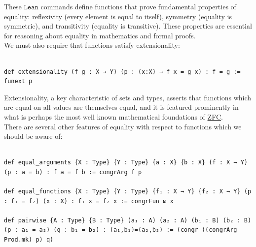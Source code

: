 \documentclass{book}
\theoremstyle{definition}
\newcounter{lcounter}
\begin{document}
These $\texttt{Lean}$ commands define functions that prove fundamental properties of equality: reflexivity (every element is equal to itself), symmetry (equality is symmetric), and transitivity (equality is transitive). These properties are essential for reasoning about equality in mathematics and formal proofs.\\

We must also require that functions satisfy extensionality:

\begin{center}
\begin{tcolorbox}[width=5in,colback={white},title={\begin{center}\texttt{Lean \thelcounter} \addtocounter{lcounter}{1}  \end{center}},colbacktitle=Blue,coltitle=black]
\begin{verbatim}

def extensionality (f g : X → Y) (p : (x:X) → f x = g x) : f = g := funext p

\end{verbatim}
\end{tcolorbox}
\end{center}

Extensionality, a key characteristic of sets and types, asserts that functions which are equal on all values are themselves equal, and it is featured prominently in what is perhaps the most well known mathematical foundations of \href{https://encyclopediaofmath.org/wiki/ZFC}{ZFC}.\\

There are several other features of equality with respect to functions which we should be aware of:

\begin{center}
\begin{tcolorbox}[width=5in,colback={white},title={\begin{center}\texttt{Lean \thelcounter} \addtocounter{lcounter}{1}  \end{center}},colbacktitle=Blue,coltitle=black]
\begin{verbatim}

def equal_arguments {X : Type} {Y : Type} {a : X} {b : X} (f : X → Y) (p : a = b) : f a = f b := congrArg f p

def equal_functions {X : Type} {Y : Type} {f₁ : X → Y} {f₂ : X → Y} (p : f₁ = f₂) (x : X) : f₁ x = f₂ x := congrFun ω x

def pairwise {A : Type} {B : Type} (a₁ : A) (a₂ : A) (b₁ : B) (b₂ : B) (p : a₁ = a₂) (q : b₁ = b₂) : (a₁,b₁)=(a₂,b₂) := (congr ((congrArg Prod.mk) p) q)

\end{verbatim}
\end{tcolorbox}
\end{center}
\end{document}
